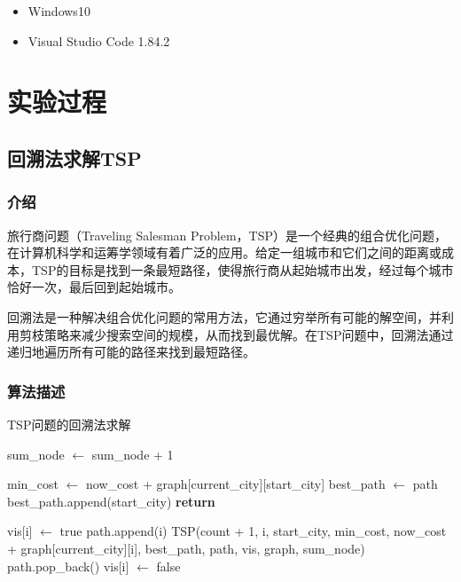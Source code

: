 \documentclass[lang=cn,11pt,a4paper]{elegantpaper}
\begin{document}
\begin{itemize}
    \item Windows10
    \item Visual Studio Code 1.84.2
\end{itemize}

\section{实验过程}

\subsection{回溯法求解TSP}

\subsubsection{介绍}
旅行商问题（Traveling Salesman Problem，TSP）是一个经典的组合优化问题，在计算机科学和运筹学领域有着广泛的应用。给定一组城市和它们之间的距离或成本，TSP的目标是找到一条最短路径，使得旅行商从起始城市出发，经过每个城市恰好一次，最后回到起始城市。

回溯法是一种解决组合优化问题的常用方法，它通过穷举所有可能的解空间，并利用剪枝策略来减少搜索空间的规模，从而找到最优解。在TSP问题中，回溯法通过递归地遍历所有可能的路径来找到最短路径。

\subsubsection{算法描述}
\begin{algorithm}[H]
\caption{TSP问题的回溯法求解}
\begin{algorithmic}[1]
\State sum\_node $\gets$ sum\_node + 1 

        \State min\_cost $\gets$ now\_cost + graph[current\_city][start\_city]
        \State best\_path $\gets$ path
        \State best\_path.append(start\_city)
    \EndIf
    \State \textbf{return}
\EndIf

        \State vis[i] $\gets$ true 
        \State path.append(i) 
        \State TSP(count + 1, i, start\_city, min\_cost, now\_cost + graph[current\_city][i], best\_path, path, vis, graph, sum\_node)
        \State path.pop\_back() 
        \State vis[i] $\gets$ false
    \EndIf
\EndFor
\end{algorithmic}
\end{algorithm}
\end{document}
